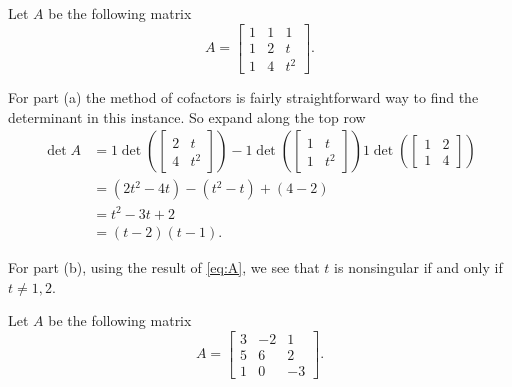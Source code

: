 \begin{questions}
  \question Let $A$ be the following matrix
  \[
    A=
    \begin{bmatrix}
      1&1&1\\
      1&2&t\\
      1&4&t^2
    \end{bmatrix}.
  \]
  \begin{solution}
    For part (a) the method of cofactors is fairly straightforward way to
    find the determinant in this instance. So expand along the top row
    \[
      \label{eq:A}
      \tag{$\star$}
      \begin{aligned}
        \det A
        &=%
        1\det\left(\begin{bmatrix}2&t\\4&t^2\end{bmatrix}\right)%
        -1\det\left(\begin{bmatrix}1&t\\1&t^2\end{bmatrix}\right)%
        1\det\left(\begin{bmatrix}1&2\\1&4\end{bmatrix}\right)\\%
        &=(2t^2-4t)-(t^2-t)+(4-2)\\%
        &=t^2-3t+2\\
        &=(t-2)(t-1).
      \end{aligned}
    \]

    For part (b), using the result of \eqref{eq:A}, we see that $t$ is
    nonsingular if and only if $t\neq 1,2$.
  \end{solution}
  \question Let $A$ be the following matrix
  \[
    A=
    \begin{bmatrix}
      3&-2&1\\
      5&6&2\\
      1&0&-3
    \end{bmatrix}.
  \]
  \begin{parts}

\end{parts}
\end{questions}
